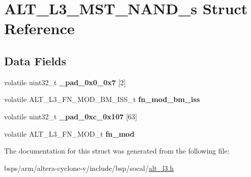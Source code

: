 \hypertarget{structALT__L3__MST__NAND__s}{}\section{A\+L\+T\+\_\+\+L3\+\_\+\+M\+S\+T\+\_\+\+N\+A\+N\+D\+\_\+s Struct Reference}
\label{structALT__L3__MST__NAND__s}
\subsection*{Data Fields}
\begin{DoxyCompactItemize}
\item 
\mbox{\label{structALT__L3__MST__NAND__s_a28749783321e29679e982762ff6ce094}} 
volatile uint32\+\_\+t {\bfseries \+\_\+pad\+\_\+0x0\+\_\+0x7} \mbox{[}2\mbox{]}
\item 
\mbox{\label{structALT__L3__MST__NAND__s_acf2cb661a440bc0fbda370a2e524a205}} 
volatile A\+L\+T\+\_\+\+L3\+\_\+\+F\+N\+\_\+\+M\+O\+D\+\_\+\+B\+M\+\_\+\+I\+S\+S\+\_\+t {\bfseries fn\+\_\+mod\+\_\+bm\+\_\+iss}
\item 
\mbox{\label{structALT__L3__MST__NAND__s_a28b748bb6b0494c72391d271c0c97cfa}} 
volatile uint32\+\_\+t {\bfseries \+\_\+pad\+\_\+0xc\+\_\+0x107} \mbox{[}63\mbox{]}
\item 
\mbox{\label{structALT__L3__MST__NAND__s_ac070ce654bf570cd43fd245f5e0f7d45}} 
volatile A\+L\+T\+\_\+\+L3\+\_\+\+F\+N\+\_\+\+M\+O\+D\+\_\+t {\bfseries fn\+\_\+mod}
\end{DoxyCompactItemize}


The documentation for this struct was generated from the following file\+:\begin{DoxyCompactItemize}
\item 
bsps/arm/altera-\/cyclone-\/v/include/bsp/socal/\mbox{\hyperlink{alt__l3_8h}{alt\+\_\+l3.\+h}}\end{DoxyCompactItemize}
